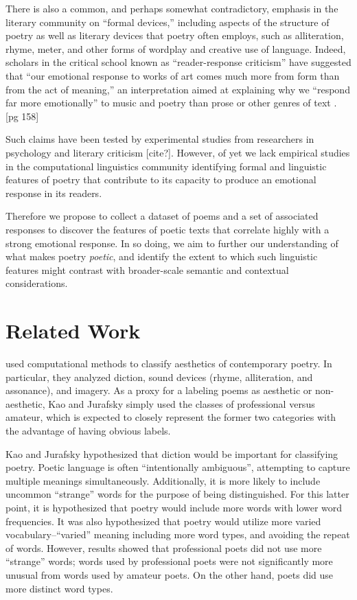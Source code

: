 \documentclass[11pt]{article}
\begin{document}
There is also a common, and perhaps somewhat contradictory, emphasis in the literary community on ``formal devices,'' including aspects of the structure of poetry as well as literary devices that poetry often employs, such as alliteration, rhyme, meter, and other forms of wordplay and creative use of language. Indeed, scholars in the critical school known as ``reader-response criticism'' have suggested that ``our emotional response to works of art comes much more from form than from the act of meaning,'' an interpretation aimed at explaining why we ``respond far more emotionally'' to music and poetry than prose or other genres of text \cite{holland}. [pg 158]

Such claims have been tested by experimental studies from researchers in psychology and literary criticism [cite?]. However, of yet we lack empirical studies in the computational linguistics community identifying formal and linguistic features of poetry that contribute to its capacity to produce an emotional response in its readers.

Therefore we propose to collect a dataset of poems and a set of associated responses to discover the features of poetic texts that correlate highly with a strong emotional response. In so doing, we aim to further our understanding of what makes poetry \emph{poetic}, and identify the extent to which such linguistic features might contrast with broader-scale semantic and contextual considerations.



\section{Related Work}


 used computational methods to classify aesthetics of contemporary poetry. In particular, they analyzed diction, sound devices (rhyme, alliteration, and assonance), and imagery. As a proxy for a labeling poems as aesthetic or non-aesthetic, Kao and Jurafsky simply used the classes of professional versus amateur, which is expected to closely represent the former two categories with the advantage of having obvious labels.

Kao and Jurafsky hypothesized that diction would be important for classifying poetry. Poetic language is often ``intentionally ambiguous'', attempting to capture multiple meanings simultaneously. Additionally, it is more likely to include uncommon ``strange'' words for the purpose of being distinguished. For this latter point, it is hypothesized that poetry would include more words with lower word frequencies. It was also hypothesized that poetry would utilize more varied vocabulary--``varied'' meaning including more word types, and avoiding the repeat of words. However, results showed that professional poets did not use more ``strange'' words; words used by professional poets were not significantly more unusual from words used by amateur poets. On the other hand, poets did use more distinct word types.
\end{document}
